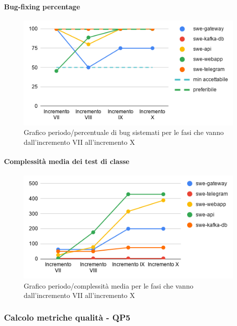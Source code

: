 \paragraph{Bug-fixing percentage}
\begin{figure}[H]
			\centering
			\includegraphics[width=0.8\linewidth]{./res/images/QM-TEST-6-BFP.png}
			\caption{Grafico periodo/percentuale di bug sistemati per le fasi che vanno dall'incremento VII all'incremento X}
			\label{fig:Grafico periodo/percentuale di bug sistemati per le fasi che vanno dall'incremento VII all'incremento X}
	\end{figure}
\paragraph{Complessità media dei test di classe}
\begin{figure}[H]
			\centering
			\includegraphics[width=0.8\linewidth]{./res/images/QM-TEST-7-CMTC.png}
			\caption{Grafico periodo/complessità media per le fasi che vanno dall'incremento VII all'incremento X}
			\label{fig:Grafico periodo/complessità media per le fasi che vanno dall'incremento VII all'incremento X}
	\end{figure}


\subsubsection{Calcolo metriche qualità - QP5}
